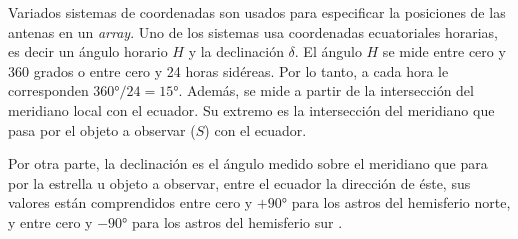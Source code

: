 Variados sistemas de coordenadas son usados para especificar la posiciones de las antenas en un \textit{array}. Uno de los sistemas usa coordenadas ecuatoriales horarias, es decir un ángulo horario $H$ y la declinación $\delta$. El ángulo $H$ se mide entre cero y 360 grados o entre cero y 24 horas sidéreas. Por lo tanto, a cada hora le corresponden $360°/24 = 15°$. Además, se mide a partir de la intersección del meridiano local con el ecuador. Su extremo es la intersección del meridiano que pasa por el objeto a observar ($S$) con el ecuador. 

Por otra parte, la declinación es el ángulo medido sobre el meridiano que para por la estrella u objeto a observar, entre el ecuador la dirección de éste, sus valores están comprendidos entre cero y $+90°$ para los astros del hemisferio norte, y entre cero y $-90°$ para los astros del hemisferio sur \citep{astroelemental}.

